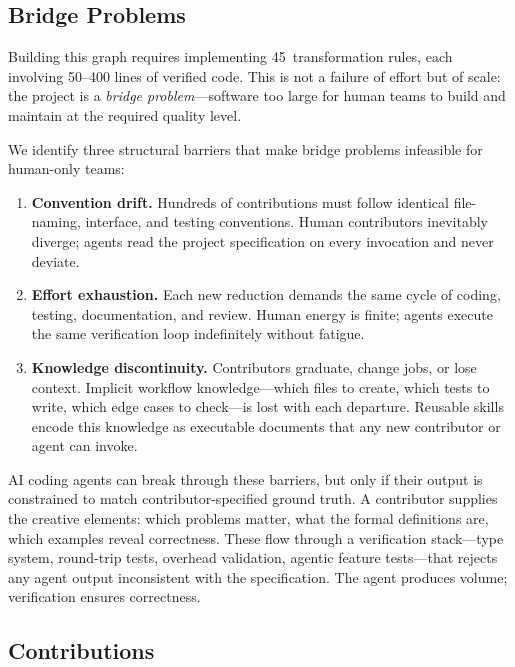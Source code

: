 \documentclass[conference]{IEEEtran}
\begin{document}
\subsection{Bridge Problems}

Building this graph requires implementing 45~transformation rules, each involving 50--400 lines of verified code.
This is not a failure of effort but of scale: the project is a \emph{bridge problem}---software too large for human teams to build and maintain at the required quality level.

We identify three structural barriers that make bridge problems infeasible for human-only teams:
\begin{enumerate}
  \item \textbf{Convention drift.} Hundreds of contributions must follow identical file-naming, interface, and testing conventions.
    Human contributors inevitably diverge; agents read the project specification on every invocation and never deviate.
  \item \textbf{Effort exhaustion.} Each new reduction demands the same cycle of coding, testing, documentation, and review.
    Human energy is finite; agents execute the same verification loop indefinitely without fatigue.
  \item \textbf{Knowledge discontinuity.} Contributors graduate, change jobs, or lose context.
    Implicit workflow knowledge---which files to create, which tests to write, which edge cases to check---is lost with each departure.
    Reusable skills encode this knowledge as executable documents that any new contributor or agent can invoke.
\end{enumerate}

AI coding agents can break through these barriers, but only if their output is constrained to match contributor-specified ground truth.
A contributor supplies the creative elements: which problems matter, what the formal definitions are, which examples reveal correctness.
These flow through a verification stack---type system, round-trip tests, overhead validation, agentic feature tests---that rejects any agent output inconsistent with the specification.
The agent produces volume; verification ensures correctness.

\subsection{Contributions}
\end{document}
